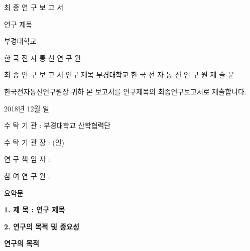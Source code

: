 \documentclass[chapter,oneside]{oblivoir}
\begin{document}
\begin{center}
	
	{\scshape\LARGE 최 종 연 구 보 고 서 \par}
	\vfill
	{\scshape\Large 연구 제목 \par}
\vfill
\vfill
	{ 부경대학교\par}
	
    \vfill
    
	한 국 전 자 통 신 연 구 원

	\vfill

    
\end{center}

\newpage
\begin{center}
    최 종 연 구 보 고 서
    \vfill
    연구 제목
    \vfill
    부경대학교
    \vfill
    한 국 전 자 통 신 연 구 원
    \vfill
    제     출     문
    \vfill    
    
    한국전자통신연구원장  귀하
    \vfill
    본 보고서를 연구제목의 최종연구보고서로 제출합니다. 
    
\vfill
2018년 12월 일\par
\end{center}

\vfill
\vspace{0.5cm}
수  탁  기  관 :  부경대학교 산학협력단\par
\vspace{0.5cm}
수 탁 기 관 장 :           (인)\par
\vspace{0.5cm}
연 구 책 임 자 :  \par
\vspace{0.5cm}
참 여 연 구 원 :  \par

\newpage


\begin{center}
    {\scshape\LARGE 요약문 \par}    
\end{center}


{\Large\textbf{1. 제   목 : 연구 제목}  \par}
\vspace{1cm}
{ \Large\textbf{2. 연구의 목적 및 중요성} \par}
\vspace{1cm}
\textbf{연구의 목적}
\end{document}
